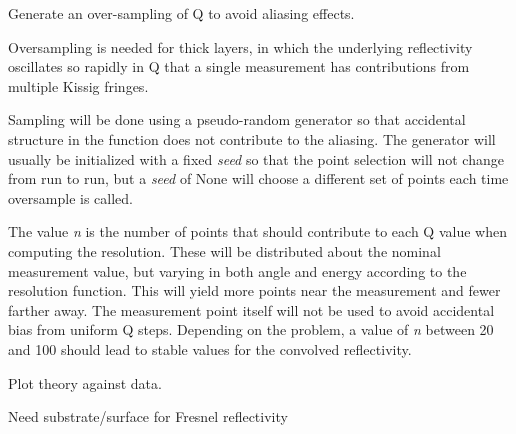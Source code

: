 \documentclass[letterpaper,10pt,english]{sphinxmanual}
\begin{document}
\begin{fulllineitems}
\begin{fulllineitems}
\label{api/probe:refl1d.probe.NeutronProbe.oversample}
Generate an over-sampling of Q to avoid aliasing effects.

Oversampling is needed for thick layers, in which the underlying
reflectivity oscillates so rapidly in Q that a single measurement
has contributions from multiple Kissig fringes.

Sampling will be done using a pseudo-random generator so that
accidental structure in the function does not contribute to the
aliasing.  The generator will usually be initialized with a fixed
\emph{seed} so that the point selection will not change from run to run,
but a \emph{seed} of None will choose a different set of points each time
oversample is called.

The value \emph{n} is the number of points that should contribute to
each Q value when computing the resolution.   These will be
distributed about the nominal measurement value, but varying in
both angle and energy according to the resolution function.  This
will yield more points near the measurement and fewer farther away.
The measurement point itself will not be used to avoid accidental
bias from uniform Q steps.  Depending on the problem, a value of
\emph{n} between 20 and 100 should lead to stable values for the convolved
reflectivity.

\end{fulllineitems}


\begin{fulllineitems}
\label{api/probe:refl1d.probe.NeutronProbe.parameters}
\end{fulllineitems}


\begin{fulllineitems}
\label{api/probe:refl1d.probe.NeutronProbe.plot}
Plot theory against data.

Need substrate/surface for Fresnel reflectivity

\end{fulllineitems}



\end{fulllineitems}
\end{document}
